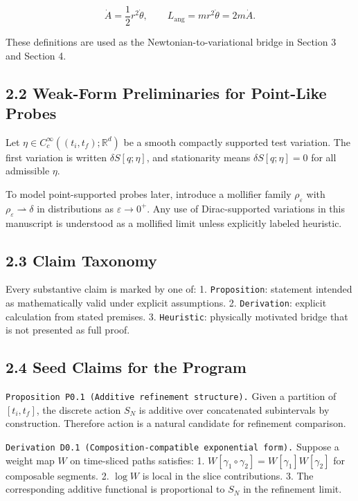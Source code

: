 \documentclass[
]{article}
\begin{document}
\[
\dot A = \frac{1}{2}r^2\dot\theta,\qquad
L_{\mathrm{ang}} = m r^2\dot\theta = 2m\dot A.
\]

These definitions are used as the Newtonian-to-variational bridge in
Section 3 and Section 4.

\subsection{2.2 Weak-Form Preliminaries for Point-Like
Probes}\label{weak-form-preliminaries-for-point-like-probes}

Let \(\eta\in C_c^\infty((t_i,t_f);\mathbb{R}^d)\) be a smooth compactly
supported test variation. The first variation is written
\(\delta S[q;\eta]\), and stationarity means \(\delta S[q;\eta]=0\) for
all admissible \(\eta\).

To model point-supported probes later, introduce a mollifier family
\(\rho_\varepsilon\) with \(\rho_\varepsilon \rightharpoonup \delta\) in
distributions as \(\varepsilon\to 0^+\). Any use of Dirac-supported
variations in this manuscript is understood as a mollified limit unless
explicitly labeled heuristic.

\subsection{2.3 Claim Taxonomy}\label{claim-taxonomy}

Every substantive claim is marked by one of: 1. \texttt{Proposition}:
statement intended as mathematically valid under explicit assumptions.
2. \texttt{Derivation}: explicit calculation from stated premises. 3.
\texttt{Heuristic}: physically motivated bridge that is not presented as
full proof.

\subsection{2.4 Seed Claims for the
Program}\label{seed-claims-for-the-program}

\texttt{Proposition\ P0.1\ (Additive\ refinement\ structure).} Given a
partition of \([t_i,t_f]\), the discrete action \(S_N\) is additive over
concatenated subintervals by construction. Therefore action is a natural
candidate for refinement comparison.

\texttt{Derivation\ D0.1\ (Composition-compatible\ exponential\ form).}
Suppose a weight map \(W\) on time-sliced paths satisfies: 1.
\(W[\gamma_1\!\circ\!\gamma_2]=W[\gamma_1]W[\gamma_2]\) for composable
segments. 2. \(\log W\) is local in the slice contributions. 3. The
corresponding additive functional is proportional to \(S_N\) in the
refinement limit.
\end{document}
